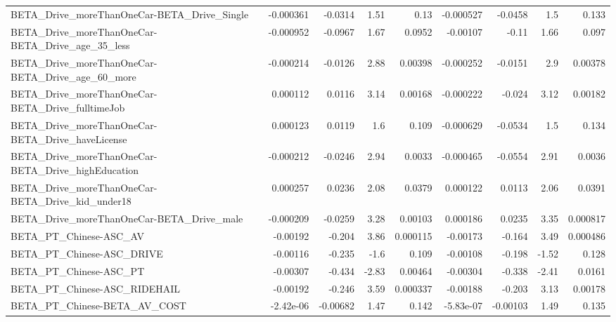 \begin{tabular}{lrrrrrrrr}
BETA\_Drive\_moreThanOneCar-BETA\_Drive\_Single        &   -0.000361 &      -0.0314 &     1.51 &     0.13 &  -0.000527 &     -0.0458 &          1.5 &         0.133 \\
BETA\_Drive\_moreThanOneCar-BETA\_Drive\_age\_35\_less   &   -0.000952 &      -0.0967 &     1.67 &   0.0952 &   -0.00107 &       -0.11 &         1.66 &         0.097 \\
BETA\_Drive\_moreThanOneCar-BETA\_Drive\_age\_60\_more   &   -0.000214 &      -0.0126 &     2.88 &  0.00398 &  -0.000252 &     -0.0151 &          2.9 &       0.00378 \\
BETA\_Drive\_moreThanOneCar-BETA\_Drive\_fulltimeJob   &    0.000112 &       0.0116 &     3.14 &  0.00168 &  -0.000222 &      -0.024 &         3.12 &       0.00182 \\
BETA\_Drive\_moreThanOneCar-BETA\_Drive\_haveLicense   &    0.000123 &       0.0119 &      1.6 &    0.109 &  -0.000629 &     -0.0534 &          1.5 &         0.134 \\
BETA\_Drive\_moreThanOneCar-BETA\_Drive\_highEducation &   -0.000212 &      -0.0246 &     2.94 &   0.0033 &  -0.000465 &     -0.0554 &         2.91 &        0.0036 \\
BETA\_Drive\_moreThanOneCar-BETA\_Drive\_kid\_under18   &    0.000257 &       0.0236 &     2.08 &   0.0379 &   0.000122 &      0.0113 &         2.06 &        0.0391 \\
BETA\_Drive\_moreThanOneCar-BETA\_Drive\_male          &   -0.000209 &      -0.0259 &     3.28 &  0.00103 &   0.000186 &      0.0235 &         3.35 &      0.000817 \\
BETA\_PT\_Chinese-ASC\_AV                             &    -0.00192 &       -0.204 &     3.86 & 0.000115 &   -0.00173 &      -0.164 &         3.49 &      0.000486 \\
BETA\_PT\_Chinese-ASC\_DRIVE                          &    -0.00116 &       -0.235 &     -1.6 &    0.109 &   -0.00108 &      -0.198 &        -1.52 &         0.128 \\
BETA\_PT\_Chinese-ASC\_PT                             &    -0.00307 &       -0.434 &    -2.83 &  0.00464 &   -0.00304 &      -0.338 &        -2.41 &        0.0161 \\
BETA\_PT\_Chinese-ASC\_RIDEHAIL                       &    -0.00192 &       -0.246 &     3.59 & 0.000337 &   -0.00188 &      -0.203 &         3.13 &       0.00178 \\
BETA\_PT\_Chinese-BETA\_AV\_COST                       &   -2.42e-06 &     -0.00682 &     1.47 &    0.142 &  -5.83e-07 &    -0.00103 &         1.49 &         0.135 \\

\end{tabular}
